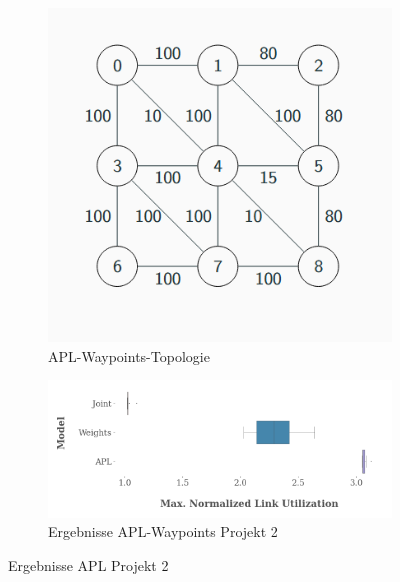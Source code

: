 \documentclass[sigconf,nonacm,review,language=english,language=german]{acmart}
\begin{document}
            \begin{figure}[h]
                \centering
                 \begin{subfigure}[c]{0.34\textwidth}
                    \centering
                    \includegraphics[width=0.9\linewidth]{Grafiken/projekt2/apl_waypoints_grid_topo.png}
                    \caption{APL-Waypoints-Topologie}
                    \label{fig:ergebnisse_projekt_2_apl_waypoints_topologie}
                \end{subfigure}
                \begin{subfigure}[c]{0.64\textwidth}
                    \centering
                    \includegraphics[width=1\linewidth]{Grafiken/projekt2/result_apl_1.png}
                    \caption{Ergebnisse APL-Waypoints Projekt 2}
                    \label{fig:ergebnisse_projekt_2_apl_waypoints_ergebnisse}
                \end{subfigure}
                \caption{Ergebnisse APL Projekt 2}
                \label{fig:ergebnisse_projekt_2_apl_waypoints}
            \end{figure}
            
\end{document}
